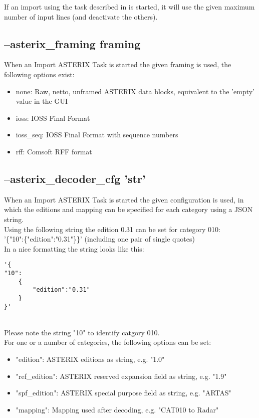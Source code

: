 If an import using the task described in  is started, it will use the given maximum number of input lines (and deactivate the others).

\subsection{--asterix\_framing framing}

When an Import ASTERIX Task is started the given framing is used, the following options exist:

\begin{itemize}
\item none:  Raw, netto, unframed ASTERIX data blocks, equivalent to the 'empty' value in the GUI
\item ioss:  IOSS Final Format
\item ioss\_seq: IOSS Final Format with sequence numbers
\item rff: Comsoft RFF format
\end{itemize}

\subsection{--asterix\_decoder\_cfg 'str'}

When an Import ASTERIX Task is started the given configuration is used, in which the editions and mapping can be specified for each category using a JSON string. \\

Using the following string the edition 0.31 can be set for category 010:  \\
'\{"10":\{"edition":"0.31"\}\}' (including one pair of single quotes) \\

In a nice formatting the string looks like this:
\begin{lstlisting}[basicstyle=\small\ttfamily]
'{
"10":
    {
        "edition":"0.31"
    }
}'
\end{lstlisting}
\ \\

Please note the string "10" to identify catgory 010. \\

For one or a number of categories, the following options can be set:

\begin{itemize}
\item "edition":  ASTERIX editions as string, e.g. "1.0"
\item "ref\_edition":  ASTERIX reserved expansion field as string, e.g. "1.9"
\item "spf\_edition": ASTERIX special purpose field as string, e.g. "ARTAS"
\item "mapping": Mapping used after decoding, e.g. "CAT010 to Radar"
\end{itemize}
\ \\

